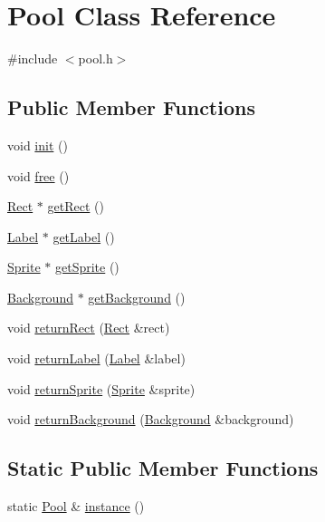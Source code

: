 \hypertarget{class_pool}{}\section{Pool Class Reference}
\label{class_pool}


{\ttfamily \#include $<$pool.\+h$>$}

\subsection*{Public Member Functions}
\begin{DoxyCompactItemize}
\item 
void \hyperlink{class_pool_a7b5bfb074b19ea0169edf7c2d73b2f6e}{init} ()
\item 
void \hyperlink{class_pool_aa2bcc7b11c5f0a438b1fe5405ba698ff}{free} ()
\item 
\hyperlink{class_rect}{Rect} $\ast$ \hyperlink{class_pool_a2ea49e227ce14fcb926d451f9f59e452}{get\+Rect} ()
\item 
\hyperlink{class_label}{Label} $\ast$ \hyperlink{class_pool_a13ce02d7dbee29305a83dcdb22a01661}{get\+Label} ()
\item 
\hyperlink{class_sprite}{Sprite} $\ast$ \hyperlink{class_pool_abd15708186d45b2e45312c872dd84384}{get\+Sprite} ()
\item 
\hyperlink{class_background}{Background} $\ast$ \hyperlink{class_pool_a367c875efe93a27fea4bcaf0ed281abd}{get\+Background} ()
\item 
void \hyperlink{class_pool_a3b5250c08babf163d9d4877c7a2a6f40}{return\+Rect} (\hyperlink{class_rect}{Rect} \&rect)
\item 
void \hyperlink{class_pool_a2a38a2d1aa883152d27fa213ac2cc2e8}{return\+Label} (\hyperlink{class_label}{Label} \&label)
\item 
void \hyperlink{class_pool_a227334c0983a0c1bf42d72a44fcfee8f}{return\+Sprite} (\hyperlink{class_sprite}{Sprite} \&sprite)
\item 
void \hyperlink{class_pool_af6234b218a3dd72a440a3381b35c9e36}{return\+Background} (\hyperlink{class_background}{Background} \&background)
\end{DoxyCompactItemize}
\subsection*{Static Public Member Functions}
\begin{DoxyCompactItemize}
\item 
static \hyperlink{class_pool}{Pool} \& \hyperlink{class_pool_a20e44e0054d4eedf57f1943b87c06e20}{instance} ()
\end{DoxyCompactItemize}
